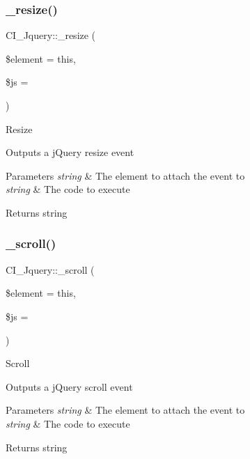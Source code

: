 \subsubsection{\texorpdfstring{\+\_\+resize()}{\_resize()}}
{\footnotesize\ttfamily C\+I\+\_\+\+Jquery\+::\+\_\+resize (\begin{DoxyParamCaption}\item[{}]{\$element = {\ttfamily \textquotesingle{}this\textquotesingle{}},  }\item[{}]{\$js = {\ttfamily \textquotesingle{}\textquotesingle{}} }\end{DoxyParamCaption})\hspace{0.3cm}{\ttfamily [protected]}}

Resize

Outputs a j\+Query resize event


\begin{DoxyParams}{Parameters}
{\em string} & The element to attach the event to \\
\hline
{\em string} & The code to execute \\
\hline
\end{DoxyParams}
\begin{DoxyReturn}{Returns}
string 
\end{DoxyReturn}
\mbox{\label{class_c_i___jquery_ae5c1c367688e1a5f1569e4c63e8240b7}} 
\subsubsection{\texorpdfstring{\+\_\+scroll()}{\_scroll()}}
{\footnotesize\ttfamily C\+I\+\_\+\+Jquery\+::\+\_\+scroll (\begin{DoxyParamCaption}\item[{}]{\$element = {\ttfamily \textquotesingle{}this\textquotesingle{}},  }\item[{}]{\$js = {\ttfamily \textquotesingle{}\textquotesingle{}} }\end{DoxyParamCaption})\hspace{0.3cm}{\ttfamily [protected]}}

Scroll

Outputs a j\+Query scroll event


\begin{DoxyParams}{Parameters}
{\em string} & The element to attach the event to \\
\hline
{\em string} & The code to execute \\
\hline
\end{DoxyParams}
\begin{DoxyReturn}{Returns}
string 
\end{DoxyReturn}
\mbox{\label{class_c_i___jquery_af5cfcc4d5ee8426b68077ac721ccb988}} 
